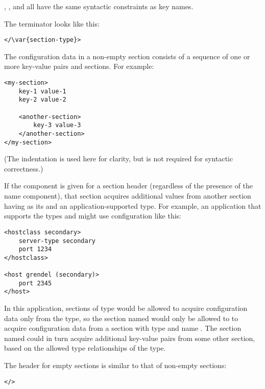 \documentclass{howto}
\begin{document}
, , and  all have the same
syntactic constraints as key names.

The terminator looks like this:

\begin{verbatim}
</\var{section-type}>
\end{verbatim}

The configuration data in a non-empty section consists of a sequence
of one or more key-value pairs and sections.  For example:

\begin{verbatim}
<my-section>
    key-1 value-1
    key-2 value-2

    <another-section>
        key-3 value-3
    </another-section>
</my-section>
\end{verbatim}

(The indentation is used here for clarity, but is not required for
syntactic correctness.)

If the  component is given for a section header
(regardless of the presence of the name component), that section
acquires additional values from another section having 
as its  and an application-supported type.  For example, an
application that supports the types  and 
might use configuration like this:

\begin{verbatim}
<hostclass secondary>
    server-type secondary
    port 1234
</hostclass>

<host grendel (secondary)>
    port 2345
</host>
\end{verbatim}

In this application, sections of type  would be allowed to
acquire configuration data only from the  type, so the
section named  would only be allowed to to acquire
configuration data from a section with type  and name
.  The  section named 
could in turn acquire additional key-value pairs from some other
section, based on the allowed type relationships of the
 type.

The header for empty sections is similar to that of non-empty
sections:

\begin{alltt}
<   />
\end{alltt}
\end{document}
